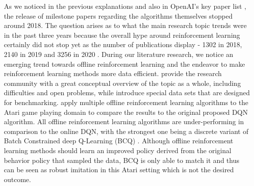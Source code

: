 \par
As we noticed in the previous explanations and also in OpenAI's key paper list \cite[]{keypaperlist}, the release of milestone papers regarding the algorithms themselves stopped around 2018. The question arises as to what the main research topic trends were in the past three years because the overall hype around reinforcement learning certainly did not stop yet as the number of publications display - 1302 in 2018, 2140 in 2019 and 3256 in 2020 \cite[]{arxiv}. During our literature research, we notice an emerging trend towards offline reinforcement learning and the endeavor to make reinforcement learning methods more data efficient. \cite{levine2020offline} provide the research community with a great conceptual overview of the topic as a whole, including difficulties and open problems, while \cite{fu2021d4rl} introduce special data sets that are designed for benchmarking. \cite{fujimoto2019benchmarking} apply multiple offline reinforcement learning algorithms to the Atari game playing domain to compare the results to the original proposed DQN algorithm. All offline reinforcement learning algorithms are under-performing in comparison to the online DQN, with the strongest one being a discrete variant of Batch Constrained deep Q-Learning (BCQ) \cite[pp.~7-9]{fujimoto2019benchmarking}. Although offline reinforcement learning methods should learn an improved policy derived from the original behavior policy that sampled the data, BCQ is only able to match it and thus can be seen as robust imitation in this Atari setting \cite[pp.~7]{fujimoto2019benchmarking} which is not the desired outcome.
\par
